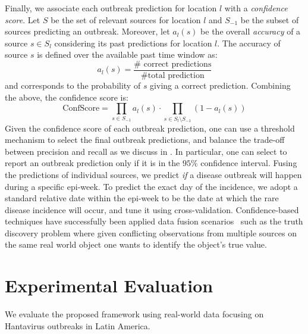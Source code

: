 \documentclass[twoside,leqno,twocolumn]{article}
\newcommand{\fullmodel}{{{\sf SourceSeer}}\xspace}
\begin{document}
Finally, we associate each outbreak prediction for location $l$ with a {\em confidence score}. Let $S$ be the set of relevant sources for location $l$ and $S_{-1}$ be the subset of sources predicting an outbreak. Moreover, let $a_l(s)$ be the overall {\em accuracy} of a source $s \in S_l$ considering its past predictions for location $l$. The accuracy of source $s$ is defined over the available past time window as:
\begin{equation}
a_l(s) = \frac{\#\mbox{ correct predictions}}{\#\mbox{total prediction}}	
\end{equation}
and corresponds to the probability of $s$ giving a correct prediction. Combining the above, the confidence score is: 
\begin{equation}
\textrm{ConfScore} = \prod_{s \in S_{-1}}a_l(s) \cdot \prod_{s \in S_l \setminus S_{-1}} (1 - a_l(s))
\label{eq:conf}
\end{equation}
Given the confidence score of each outbreak prediction, one can use a threshold mechanism to select the final outbreak predictions, and balance the trade-off between precision and recall as we discuss in . In particular, one can select to report an outbreak prediction only if it is in the $95\%$ confidence interval. Fusing the predictions of individual sources, we predict  {\em if} a disease outbreak will happen during a specific epi-week. To predict the exact day of the incidence, we adopt a standard relative date within the epi-week to be the date at which the rare disease incidence will occur, and tune it using cross-validation. Confidence-based techniques have successfully been applied data fusion scenarios~\cite{Dong:2012:LMS:2535568.2448938} such as the truth discovery problem where given conflicting observations from multiple sources on the same real world object one wants to identify the object's true value.

\section{Experimental Evaluation}
\label{sec:exp}
We evaluate the proposed framework using real-world data focusing on Hantavirus outbreaks in Latin America.
\end{document}
